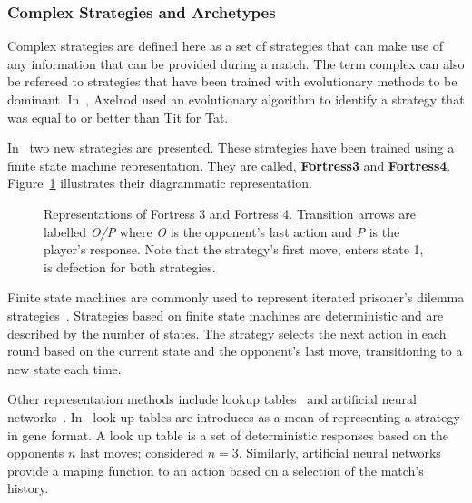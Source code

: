 \documentclass{article}
\begin{document}
\subsubsection{Complex Strategies and Archetypes}

Complex strategies are defined here as a set of strategies that can make use of any
information that can be provided during a match. The term complex can also be
refereed to strategies that have been trained with evolutionary methods to 
be dominant. In~\cite{Axelrod1987}, Axelrod used an evolutionary algorithm to 
identify a strategy that was equal to or better than Tit for Tat.

In~\cite{Ashlock2006b} two new strategies are presented. These strategies have
been trained using a finite state machine representation. They are called,
\textbf{Fortress3} and \textbf{Fortress4}. Figure~\ref{fig:fortress3_and_4}
illustrates their diagrammatic representation.

\begin{figure}[!hbtp]
\centering
    \begin{subfigure}{.4\textwidth}
        
    \end{subfigure}
    \begin{subfigure}{.4\textwidth}\centering
        
     \end{subfigure}
     \caption{Representations of Fortress 3 and Fortress 4. Transition arrows are 
     labelled \textit{O/P} where \textit{O} is the opponent’s last action and \textit{P}
     is the player’s response. Note that the strategy’s first move, enters state 1, 
     is defection for both strategies.}
     \label{fig:fortress3_and_4}
\end{figure}

Finite state machines are commonly used to represent iterated prisoner's
dilemma strategies~\cite{Miller1996, Rubinstein1986}. Strategies based on 
finite state machines are deterministic and are described by the number of states.
The strategy selects the next action in each round based on the current state 
and the opponent’s last move, transitioning to a new state each time. 

Other representation methods include lookup tables~\cite{Axelrod1987, Lindgren1994}
and artificial neural networks~\cite{Fogel1996, Lee2015}. In~\cite{Axelrod1987}
look up tables are introduces as a mean of representing a strategy in gene 
format. A look up table is a set of deterministic responses based on the
opponents \(n\) last moves; \cite{Axelrod1987} considered \(n=3\). Similarly,
artificial neural networks provide a maping function to an action
based on a selection of the match's history.
\end{document}
